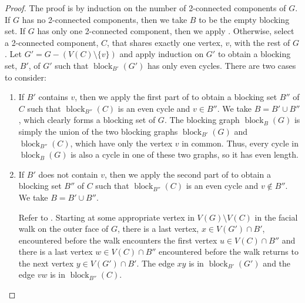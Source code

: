 \documentclass{patmorin}
\DeclareMathOperator{\block}{block}
\begin{document}
\begin{proof}
  The proof is by induction on the number of 2-connected components
  of $G$.  If $G$ has no 2-connected components, then we take $B$ to be
  the empty blocking set.  If $G$ has only one 2-connected component,
  then we apply .
  Otherwise, select a 2-connected component, $C$, that
  shares exactly one vertex, $v$, with the rest of $G$.  Let
  $G'=G-(V(C)\setminus\{v\})$ and apply induction on $G'$
  to obtain a blocking set, $B'$, of $G'$ such that $\block_{B'}(G')$
  has only even cycles.  There are two cases to consider:
  \begin{enumerate}
    \item If $B'$ contains $v$, then we apply the first part of
     to obtain a blocking set $B''$ of $C$
    such that $\block_{B''}(C)$ is an even cycle and $v\in B''$.  We take
    $B=B'\cup B''$, which clearly forms a blocking set of $G$.  
    The blocking graph $\block_B(G)$ is simply the union of the
    two blocking graphs $\block_{B'}(G)$ and $\block_{B''}(C)$, which have
    only the vertex $v$ in common.  Thus, every cycle in $\block_B(G)$
    is also a cycle in one of these two graphs, so it has even length.

    \item If $B'$ does not contain $v$, then we apply the second part
    of  to obtain a blocking set $B''$ of $C$
    such that $\block_{B''}(C)$ is an even cycle and $v\not\in B''$.
    We take $B=B'\cup B''$.

    Refer to .  
    Starting at some appropriate vertex in $V(G)\setminus V(C)$
    in the facial walk on the outer face of $G$, there is a last vertex,
    $x\in V(G')\cap B'$, encountered before the walk encounters the first
    vertex $u\in V(C)\cap B''$ and there is a last vertex $w\in V(C)\cap
    B''$ encountered before the walk returns to the next vertex $y\in
    V(G')\cap B'$.  The edge $xy$ is in $\block_{B'}(G')$ and the edge
    $vw$ is in $\block_{B''}(C)$.


\end{enumerate}
\end{proof}
\end{document}
